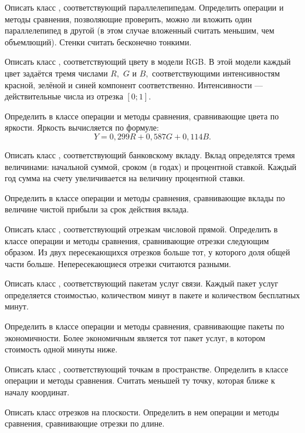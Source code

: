 \task Описать класс , соответствующий
параллелепипедам. Определить операции и методы сравнения, позволяющие
проверить, можно ли вложить один параллелепипед в другой (в этом
случае вложенный считать меньшим, чем объемлющий). Стенки считать
бесконечно тонкими.

\task Описать класс , соответствующий цвету в модели
RGB. В этой модели каждый цвет задаётся тремя числами $R,$ $G$ и $B,$
соответствующими интенсивностям красной, зелёной и синей компонент
соответственно. Интенсивности — действительные числа из отрезка
$[0; 1]$.

Определить в классе операции и методы сравнения, сравнивающие цвета по
яркости. Яркость вычисляется по формуле:
\[
Y = 0{,}299 R + 0{,}587 G + 0{,}114 B.
\]

\task Описать класс , соответствующий банковскому
вкладу. Вклад определятся тремя величинами: начальной суммой, сроком
(в годах) и процентной ставкой. Каждый год сумма на счету
увеличивается на величину процентной ставки.

Определить в классе операции и методы сравнения, сравнивающие вклады
по величине чистой прибыли за срок действия вклада.

\task Описать класс , соответствующий отрезкам числовой
прямой. Определить в классе операции и методы сравнения, сравнивающие
отрезки следующим образом. Из двух пересекающихся отрезков больше тот,
у которого доля общей части больше. Непересекающиеся отрезки считаются
разными.

\task Описать класс , соответствующий пакетам услуг
связи. Каждый пакет услуг определяется стоимостью, количеством минут в
пакете и количеством бесплатных минут.

Определить в классе операции и методы сравнения, сравнивающие пакеты
по экономичности. Более экономичным является тот пакет услуг, в
котором стоимость одной минуты ниже.

\task Описать класс , соответствующий точкам в
пространстве.  Определить в классе операции и методы
сравнения. Считать меньшей ту точку, которая ближе к началу координат.

\task Описать класс  отрезков на плоскости. Определить в нем
операции и методы сравнения, сравнивающие отрезки по длине.

